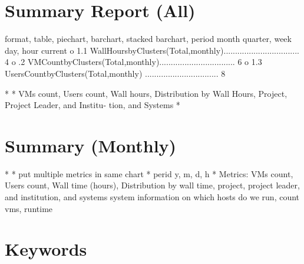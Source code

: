 \documentclass{sig-alternate}
\begin{document}
\section{Summary Report (All)}
                                                                                                        format, table, piechart, barchart, stacked barchart, period month quarter, week day, hour current                                       
o       1.1  WallHoursbyClusters(Total,monthly)................................. 4                              
o       .2  VMCountbyClusters(Total,monthly)................................. 6
o       1.3  UsersCountbyClusters(Total,monthly) ................................ 8 

*       
*       VMs count, Users count, Wall hours, Distribution by Wall Hours, Project, Project Leader, and Institu- tion, and Systems 
*                                               
\section{Summary (Monthly) }
*                       
*       put multiple metrics in same chart
*       perid y, m, d, h                                                                                                
*       Metrics: VMs count, Users count, Wall time (hours), Distribution by wall time, project, project leader, and institution, and systems 
        system information on which hosts do we run, count vms, runtime


\section{Keywords}
\end{document}
